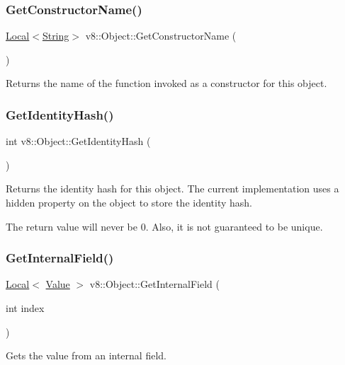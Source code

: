 \subsubsection{\texorpdfstring{Get\+Constructor\+Name()}{GetConstructorName()}}
{\footnotesize\ttfamily \mbox{\hyperlink{classv8_1_1Local}{Local}}$<$\mbox{\hyperlink{classv8_1_1String}{String}}$>$ v8\+::\+Object\+::\+Get\+Constructor\+Name (\begin{DoxyParamCaption}{ }\end{DoxyParamCaption})}

Returns the name of the function invoked as a constructor for this object. \mbox{\label{classv8_1_1Object_ac1ece41e81a499920ec3a2a3471653bc}} 
\subsubsection{\texorpdfstring{Get\+Identity\+Hash()}{GetIdentityHash()}}
{\footnotesize\ttfamily int v8\+::\+Object\+::\+Get\+Identity\+Hash (\begin{DoxyParamCaption}{ }\end{DoxyParamCaption})}

Returns the identity hash for this object. The current implementation uses a hidden property on the object to store the identity hash.

The return value will never be 0. Also, it is not guaranteed to be unique. \mbox{\label{classv8_1_1Object_aa3324fdf652d8ac3b2f27faa0559231d}} 
\subsubsection{\texorpdfstring{Get\+Internal\+Field()}{GetInternalField()}}
{\footnotesize\ttfamily \mbox{\hyperlink{classv8_1_1Local}{Local}}$<$ \mbox{\hyperlink{classv8_1_1Value}{Value}} $>$ v8\+::\+Object\+::\+Get\+Internal\+Field (\begin{DoxyParamCaption}\item[{int}]{index }\end{DoxyParamCaption})}

Gets the value from an internal field. 

